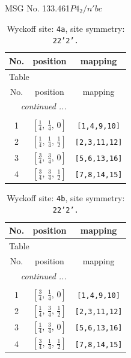 \documentclass[fleqn,8pt]{jsarticle}
\begin{document}
\setcounter{MaxMatrixCols}{32}

\renewcommand{\tablename}{Table~}
\renewcommand{\figurename}{Figure~}
\begin{center}
\LARGE
MSG No. 133.461\quad$P4_{2}/n'bc$
\end{center}
\renewcommand{\arraystretch}{1.2}
\begin{longtable}{ccc}
\caption{Wyckoff site: {\tt 4a}, site symmetry: {\tt 22'2'.}}
 \\
 \hline \hline
No. & position & mapping \\ \hline \endfirsthead

\multicolumn{2}{l}{\tablename\ \thetable{}} \\
 \hline \hline
No. & position & mapping \\ \hline \endhead

 \hline \hline
\multicolumn{2}{r}{\footnotesize\it continued ...} \\ \endfoot

 \hline \hline
\multicolumn{2}{r}{} \\ \endlastfoot

1 & $\left[ \frac{1}{4},\, \frac{1}{4},\, 0 \right]$ & {\tt [1,4,9,10]} \\ \hline
2 & $\left[ \frac{1}{4},\, \frac{1}{4},\, \frac{1}{2} \right]$ & {\tt [2,3,11,12]} \\ \hline
3 & $\left[ \frac{3}{4},\, \frac{3}{4},\, 0 \right]$ & {\tt [5,6,13,16]} \\ \hline
4 & $\left[ \frac{3}{4},\, \frac{3}{4},\, \frac{1}{2} \right]$ & {\tt [7,8,14,15]} \\
\end{longtable}
\renewcommand{\arraystretch}{1.2}
\begin{longtable}{ccc}
\caption{Wyckoff site: {\tt 4b}, site symmetry: {\tt 22'2'.}}
 \\
 \hline \hline
No. & position & mapping \\ \hline \endfirsthead

\multicolumn{2}{l}{\tablename\ \thetable{}} \\
 \hline \hline
No. & position & mapping \\ \hline \endhead

 \hline \hline
\multicolumn{2}{r}{\footnotesize\it continued ...} \\ \endfoot

 \hline \hline
\multicolumn{2}{r}{} \\ \endlastfoot

1 & $\left[ \frac{3}{4},\, \frac{1}{4},\, 0 \right]$ & {\tt [1,4,9,10]} \\ \hline
2 & $\left[ \frac{1}{4},\, \frac{3}{4},\, \frac{1}{2} \right]$ & {\tt [2,3,11,12]} \\ \hline
3 & $\left[ \frac{1}{4},\, \frac{3}{4},\, 0 \right]$ & {\tt [5,6,13,16]} \\ \hline
4 & $\left[ \frac{3}{4},\, \frac{1}{4},\, \frac{1}{2} \right]$ & {\tt [7,8,14,15]} \\
\end{longtable}
\end{document}

